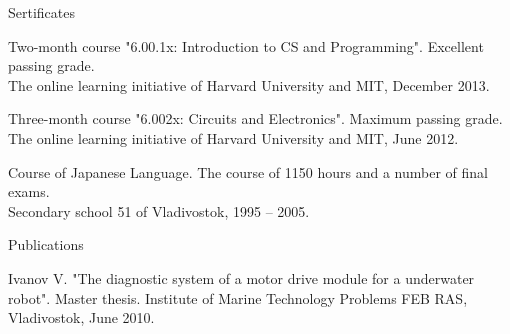 \documentclass{template}
\begin{document}
\begin{rSection}{Sertificates}

\begin{rItemize}
\item Two-month course "6.00.1x: Introduction to CS and Programming".  Excellent passing grade. \\
The online learning initiative of Harvard University and MIT, December 2013.
\item Three-month course "6.002x: Circuits and Electronics". Maximum passing grade. \\
The online learning initiative of Harvard University and MIT, June 2012.
\item Course of Japanese Language. The course of 1150 hours and a number of final exams. \\
Secondary school 51 of Vladivostok, 1995 -- 2005.
\end{rItemize}

\end{rSection}


\begin{rSection}{Publications}

\begin{rItemize}
\item Ivanov V. "The diagnostic system of a motor drive module for a underwater robot". Master thesis. Institute of Marine Technology Problems FEB RAS, Vladivostok, June 2010.
\end{rItemize}

\end{rSection}

\end{document}
